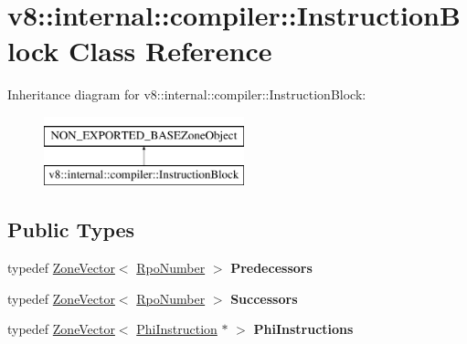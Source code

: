 \hypertarget{classv8_1_1internal_1_1compiler_1_1InstructionBlock}{}\section{v8\+:\+:internal\+:\+:compiler\+:\+:Instruction\+Block Class Reference}
\label{classv8_1_1internal_1_1compiler_1_1InstructionBlock}
Inheritance diagram for v8\+:\+:internal\+:\+:compiler\+:\+:Instruction\+Block\+:\begin{figure}[H]
\begin{center}
\leavevmode
\includegraphics[height=2.000000cm]{classv8_1_1internal_1_1compiler_1_1InstructionBlock}
\end{center}
\end{figure}
\subsection*{Public Types}
\begin{DoxyCompactItemize}
\item 
\mbox{\label{classv8_1_1internal_1_1compiler_1_1InstructionBlock_a9ab6b06c717664f7a8feb17e0bf4137d}} 
typedef \mbox{\hyperlink{classv8_1_1internal_1_1ZoneVector}{Zone\+Vector}}$<$ \mbox{\hyperlink{classv8_1_1internal_1_1compiler_1_1RpoNumber}{Rpo\+Number}} $>$ {\bfseries Predecessors}
\item 
\mbox{\label{classv8_1_1internal_1_1compiler_1_1InstructionBlock_a82c6037f394924f2ffd5e2eb9363c154}} 
typedef \mbox{\hyperlink{classv8_1_1internal_1_1ZoneVector}{Zone\+Vector}}$<$ \mbox{\hyperlink{classv8_1_1internal_1_1compiler_1_1RpoNumber}{Rpo\+Number}} $>$ {\bfseries Successors}
\item 
\mbox{\label{classv8_1_1internal_1_1compiler_1_1InstructionBlock_a7468046d3019f274d7d5f35efdfb9368}} 
typedef \mbox{\hyperlink{classv8_1_1internal_1_1ZoneVector}{Zone\+Vector}}$<$ \mbox{\hyperlink{classv8_1_1internal_1_1compiler_1_1PhiInstruction}{Phi\+Instruction}} $\ast$ $>$ {\bfseries Phi\+Instructions}
\end{DoxyCompactItemize}
